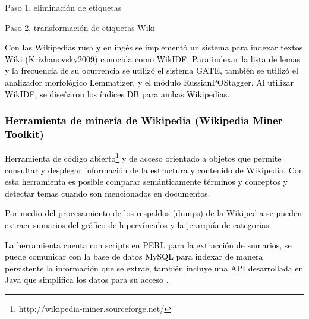 \documentclass[letterpaper]{article}
\newcommand\textstylebibuscitbase[1]{#1}
\begin{document}
\bigskip

{\sffamily
Paso 1, eliminaci\'on de etiquetas}

{\sffamily
Paso 2, transformaci\'on de etiquetas Wiki}


\bigskip

{\sffamily
\textstylebibuscitbase{\textcolor{black}{Con las Wikipedias rusa y en
ing\'es se implement\'o un sistema para indexar
}}\textstylebibuscitbase{\textcolor{black}{textos Wiki
}}\textstylebibuscitbase{\textcolor{black}{(Krizhanovsky2009)}}\textstylebibuscitbase{\textcolor{black}{
conocida como WikIDF. Para indexar la lista de lemas y la frecuencia de
su ocurrencia se utiliz\'o el sistema GATE, tambi\'en se
}}\textstylebibuscitbase{\textcolor{black}{utiliz\'o el analizador
morfol\'ogico Lemmatizer, y el m\'odulo RussianPOStagger. Al utilizar
WikIDF, se dise\~naron los \'indices DB para ambas Wikipedias.}}}


\bigskip

\subsubsection[Herramienta de miner\'ia de Wikipedia (Wikipedia Miner
Toolkit)]{\textstylebibuscitbase{\textcolor{black}{Herramienta de
miner\'ia de Wikipedia (Wikipedia Miner Toolkit)}}}
\hypertarget{RefHeading10806782078703}{}
\bigskip

{\sffamily
\textstylebibuscitbase{\textcolor{black}{Herramienta de c\'odigo
abierto}}\footnote{http://wikipedia-miner.sourceforge.net/}\textstylebibuscitbase{\textcolor{black}{
y de acceso orientado a objetos que permite consultar y desplegar
informaci\'on de la estructura y contenido de Wikipedia. Con esta
herramienta es posible comparar sem\'anticamente t\'erminos y conceptos
y detectar temas cuando son mencionados en documentos.}}}

{\sffamily
\textstylebibuscitbase{\textcolor{black}{Por medio del procesamiento de
los respaldos (dumps) de la Wikipedia se pueden extraer sumarios del
gr\'afico de hiperv\'inculos y la jerarqu\'ia de categor\'ias.}}}

{\sffamily
\textstylebibuscitbase{\textcolor{black}{La herramienta cuenta con
scripts en PERL para la extracci\'on de sumarios, se
}}\textstylebibuscitbase{\textcolor{black}{puede comunicar con la base
de datos MySQL para indexar de manera persistente la informaci\'on que
se extrae, tambi\'en incluye una API desarrollada en Java que
simplifica los datos para su acceso}}%
\textstylebibuscitbase{\textcolor{black}{.}}}
\end{document}
